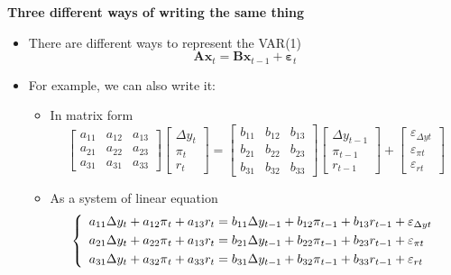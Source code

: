 \documentclass[10pt,handout]{beamer}
\begin{document}
\begin{frame}
{\textbf{Three different ways of writing the same thing}}

\begin{itemize}
\item There are different ways to represent the VAR(1)%
\begin{equation*}
\mathbf{Ax}_{t}=\mathbf{Bx}_{t-1}+\mathbf{\varepsilon }_{t}
\end{equation*}%
\pause

\item For example, we can also write it:

\begin{itemize}
\item In matrix form%
\begin{equation*}
\left[ 
\begin{array}{ccc}
a_{11} & a_{12} & a_{13} \\ 
a_{21} & a_{22} & a_{23} \\ 
{a}_{{31}} & {a}_{{31}} & a_{33}%
\end{array}%
\right] 
\begin{bmatrix}
\Delta y_{t} \\ 
\pi _{t} \\ 
r_{t}%
\end{bmatrix}%
=\left[ 
\begin{array}{ccc}
b_{11} & b_{12} & b_{13} \\ 
b_{21} & b_{22} & b_{23} \\ 
b_{31} & b_{32} & b_{33}%
\end{array}%
\right] 
\begin{bmatrix}
\Delta y_{t-1} \\ 
\pi _{t-1} \\ 
r_{t-1}%
\end{bmatrix}%
+%
\begin{bmatrix}
\varepsilon _{\Delta yt} \\ 
\varepsilon _{\pi t} \\ 
\varepsilon _{rt}%
\end{bmatrix}%
\end{equation*}%
\pause

\item As a system of linear equation%
\begin{equation*}
\left\{ 
\begin{array}{l}
a_{11}\Delta y_{t}+a_{12}\pi _{t}+a_{13}r_{t}=b_{11}\Delta y_{t-1}+b_{12}\pi
_{t-1}+b_{13}r_{t-1}+\varepsilon _{\Delta yt}\smallskip \\ 
a_{21}\Delta y_{t}+a_{22}\pi _{t}+a_{13}r_{t}=b_{21}\Delta y_{t-1}+b_{22}\pi
_{t-1}+b_{23}r_{t-1}+\varepsilon _{\pi t}\smallskip \\ 
a_{31}\Delta y_{t}+a_{32}\pi _{t}+a_{33}r_{t}=b_{31}\Delta y_{t-1}+b_{32}\pi
_{t-1}+b_{33}r_{t-1}+\varepsilon _{rt}%
\end{array}%
\right.
\end{equation*}
\end{itemize}
\end{itemize}
\end{frame}
\end{document}
